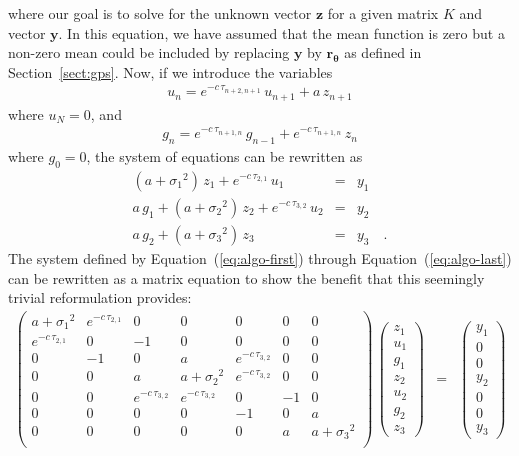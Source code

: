 \documentclass[manuscript, letterpaper]{aastex6}
\renewcommand{\eqref}[1]{\ref{eq:#1}}
\newcommand{\Eq}[1]{Equation~(\eqref{#1})}
\newcommand{\eq}[1]{\Eq{#1}}
\newcommand{\eqlabel}[1]{\label{eq:#1}}
\newcommand{\sectionname}{Section}
\newcommand{\sectref}[1]{\ref{sect:#1}}
\newcommand{\Sect}[1]{\sectionname~\sectref{#1}}
\newcommand{\sect}[1]{\Sect{#1}}
\newcommand{\bvec}[1]{{\ensuremath{\boldsymbol{#1}}}}
\begin{document}
where our goal is to solve for the unknown vector \bvec{z} for a given matrix
$K$ and vector \bvec{y}.
In this equation, we have assumed that the mean function is zero but a
non-zero mean could be included by replacing \bvec{y} by
$\bvec{r}_\bvec{\theta}$ as defined in \sect{gps}.
Now, if we introduce the variables
\begin{eqnarray}\eqlabel{algo-first}
    u_n = e^{-c\,\tau_{n+2,n+1}}\,u_{n+1} + a\,z_{n+1}
\end{eqnarray}
where $u_{N} = 0$, and
\begin{eqnarray}
    g_n = e^{-c\,\tau_{n+1,n}}\,g_{n-1} + e^{-c\,\tau_{n+1,n}}\,z_{n}
\end{eqnarray}
where $g_{0} = 0$,
the system of equations can be rewritten as
\begin{eqnarray}
(a+{\sigma_1}^2)\,z_1 + e^{-c\,\tau_{2,1}}\,u_1 &=& y_1 \\
a\,g_1 + (a+{\sigma_2}^2)\,z_2 + e^{-c\,\tau_{3,2}}\,u_2 &=& y_2 \\
a\,g_2 + (a+{\sigma_3}^2)\,z_3 &=& y_3 \quad. \eqlabel{algo-last}
\end{eqnarray}
The system defined by \eq{algo-first} through \eq{algo-last} can be
rewritten as a matrix equation to show the benefit that this seemingly trivial
reformulation provides:
\begin{eqnarray}
\begin{pmatrix}
    a+{\sigma_1}^2 & e^{-c\,\tau_{2,1}} & 0 & 0 & 0 & 0 & 0 \\
    e^{-c\,\tau_{2,1}} & 0 & -1 & 0 & 0 & 0 & 0 \\
    0 & -1 & 0 & a & e^{-c\,\tau_{3,2}} & 0 & 0 \\
    0 & 0 & a & a+{\sigma_2}^2 & e^{-c\,\tau_{3,2}} & 0 & 0 \\
    0 & 0 & e^{-c\,\tau_{3,2}} & e^{-c\,\tau_{3,2}} & 0 & -1 & 0 \\
    0 & 0 & 0 & 0 & -1 & 0 & a \\
    0 & 0 & 0 & 0 & 0 & a & a+{\sigma_3}^2 \\
\end{pmatrix}\,
\begin{pmatrix}
    z_1 \\ u_1 \\ g_1 \\ z_2 \\ u_2 \\ g_2 \\ z_3
\end{pmatrix} &=&
\begin{pmatrix}
    y_1 \\ 0 \\ 0 \\ y_2 \\ 0 \\ 0 \\ y_3
\end{pmatrix}\nonumber
\end{eqnarray}
\end{document}
